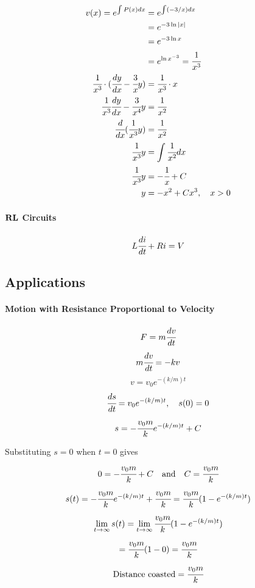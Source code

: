 \documentclass{article}
\begin{document}
                \begin{equation}
                    \begin{aligned}
                        v(x)=e^{\int P(x)dx}&=e^{\int(-3/x) dx}\\
                        &=e^{-3\ln |x|}\\
                        &=e^{-3\ln x}\\
                        &=e^{\ln x^{-3}}=\cfrac{1}{x^3}\\
                        \cfrac{1}{x^3}\cdot(\cfrac{dy}{dx}-\cfrac{3}{x}y)&=\cfrac{1}{x^3}\cdot x\\
                        \cfrac{1}{x^3}\cfrac{dy}{dx}-\cfrac{3}{x^4}y&=\cfrac{1}{x^2}\\
                        \cfrac{d}{dx}(\cfrac{1}{x^3}y)&=\cfrac{1}{x^2}\\
                        \cfrac{1}{x^3}y&=\int \cfrac{1}{x^2} dx\\
                        \cfrac{1}{x^3}y&=-\cfrac{1}{x}+C\\
                        y&=-x^2+Cx^3,\quad x>0\\
                    \end{aligned}
                \end{equation}
            \paragraph{$\bf{RL}$ Circuits}
                \[L\cfrac{di}{dt}+Ri=V\]
        \subsection{Applications}
            \paragraph{Motion with Resistance Proportional to Velocity}
            \[F=m\cfrac{dv}{dt}\]
            \[m\cfrac{dv}{dt}=-kv\]
            \[v=v_0e^{-(k/m)t}\]
            \[\cfrac{ds}{dt}=v_0e^{-(k/m)t},\quad s(0)=0\]
            \[s=-\cfrac{v_0m}{k}e^{-(k/m)t}+C\]
            \par Substituting $s=0$ when $t=0$ gives
            \[0=-\cfrac{v_0m}{k}+C\quad\text{and}\quad C=\cfrac{v_0m}{k}\]
            \[s(t)=-\cfrac{v_0m}{k}e^{-(k/m)t}+\cfrac{v_0m}{k}=\cfrac{v_0m}{k}(1-e^{-(k/m)t})\]
            \[\lim\limits_{t\to \infty}s(t)=\lim\limits_{t\to \infty}\cfrac{v_0m}{k}(1-e^{-(k/m)t})\]
            \[=\cfrac{v_0m}{k}(1-0)=\cfrac{v_0m}{k}\]
            \[\text{Distance coasted}=\cfrac{v_0m}{k}\]
\end{document}
